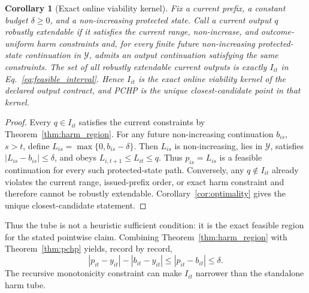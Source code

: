 \documentclass[11pt]{article}
\newtheorem{corollary}{Corollary}
\begin{document}
\begin{corollary}[Exact online viability kernel]
\label{cor:viability_kernel}
Fix a current prefix, a constant budget $\delta\geq0$, and a non-increasing protected state. Call a current output $q$ robustly extendable if it satisfies the current range, non-increase, and outcome-uniform harm constraints and, for every finite future non-increasing protected-state continuation in $\mathcal Y$, admits an output continuation satisfying the same constraints. The set of all robustly extendable current outputs is exactly $I_{it}$ in Eq.~\eqref{eq:feasible_interval}. Hence $I_{it}$ is the exact online viability kernel of the declared output contract, and PCHP is the unique closest-candidate point in that kernel.
\end{corollary}
\begin{proof}
Every $q\in I_{it}$ satisfies the current constraints by Theorem~\ref{thm:harm_region}. For any future non-increasing continuation $b_{is}$, $s>t$, define $L_{is}=\max\{0,b_{is}-\delta\}$. Then $L_{is}$ is non-increasing, lies in $\mathcal Y$, satisfies $|L_{is}-b_{is}|\leq\delta$, and obeys $L_{i,t+1}\leq L_{it}\leq q$. Thus $p_{is}=L_{is}$ is a feasible continuation for every such protected-state path. Conversely, any $q\notin I_{it}$ already violates the current range, issued-prefix order, or exact harm constraint and therefore cannot be robustly extendable. Corollary~\ref{cor:optimality} gives the unique closest-candidate statement.
\end{proof}

Thus the tube is not a heuristic sufficient condition: it is the exact feasible region for the stated pointwise claim. Combining Theorem~\ref{thm:harm_region} with Theorem~\ref{thm:pchp} yields, record by record,
\begin{equation}
  |p_{it}-y_{it}|-|b_{it}-y_{it}|
  \leq |p_{it}-b_{it}|\leq\delta.
  \label{eq:pointwise_harm}
\end{equation}
The recursive monotonicity constraint can make $I_{it}$ narrower than the standalone harm tube.
\end{document}

